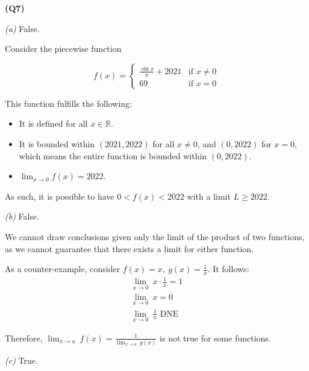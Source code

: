\documentclass[12pt, a4paper]{article}
\newcommand{\displim}[1]{\displaystyle{\lim_{#1}}}
\newcommand{\zerolim}{\displim{x \to 0}}
\newcommand{\R}{\mathbb{R}}
\begin{document}
\textbf{(Q7)}

\textit{(a)} False.

Consider the piecewise function

\[
    f(x) = \begin{cases}
        \frac{\sin x}{x} + 2021 & \text{if } x \neq 0\\
        69 & \text{if } x = 0
    \end{cases}
\]

This function fulfills the following:

\begin{itemize}
    \item It is defined for all $x \in \R$.
    \item It is bounded within $(2021, 2022)$ for all $x \neq 0$, and $(0, 2022)$ for $x = 0$,
    which means the entire function is bounded within $(0, 2022)$.
    \item $\zerolim f(x) = 2022$.
\end{itemize}

As such, it is possible to have $0 < f(x) < 2022$ with a limit $L \geq 2022$.

\textit{(b)} False.

We cannot draw conclusions given only the limit of the product of
two functions, as we cannot guarantee that there exists a limit for either function.

As a counter-example, consider $f(x) = x, \: g(x) = \displaystyle{\frac{1}{x}}$. It follows:
\[
    \begin{gathered}
        \zerolim \: x \cdot \frac{1}{x} = 1\\
        \zerolim \: x = 0\\
        \zerolim \: \frac{1}{x} \text{ DNE}
    \end{gathered}
\]

Therefore, $\displim{x \to a} \: f(x) = \displaystyle{\frac{1}{\displim{x \to a} \: g(x)}}$
is not true for some functions.

\textit{(c)} True.
\end{document}
